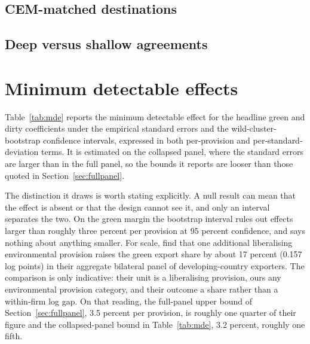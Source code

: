 \documentclass[12pt]{article}
\begin{document}
\subsection{CEM-matched destinations}\label{app:cem}


\subsection{Deep versus shallow agreements}\label{app:deepshallow}


\section{Minimum detectable effects}\label{app:mde}

Table~\ref{tab:mde} reports the minimum detectable effect for the headline green and dirty coefficients under the empirical standard errors and the wild-cluster-bootstrap confidence intervals, expressed in both per-provision and per-standard-deviation terms. It is estimated on the collapsed panel, where the standard errors are larger than in the full panel, so the bounds it reports are looser than those quoted in Section~\ref{sec:fullpanel}.

The distinction it draws is worth stating explicitly. A null result can mean that the effect is absent or that the design cannot see it, and only an interval separates the two. On the green margin the bootstrap interval rules out effects larger than roughly three percent per provision at 95 percent confidence, and says nothing about anything smaller. For scale, \citet{brandi2020} find that one additional liberalising environmental provision raises
the green export share by about 17 percent (0.157 log points) in their aggregate bilateral panel of
developing-country exporters. The comparison is only indicative: their unit is a liberalising
provision, ours any environmental provision category, and their outcome a share rather than a
within-firm log gap. On that reading, the full-panel upper bound of Section~\ref{sec:fullpanel},
3.5 percent per provision, is roughly one quarter of their figure and the collapsed-panel bound in
Table~\ref{tab:mde}, 3.2 percent, roughly one fifth.


\end{document}
